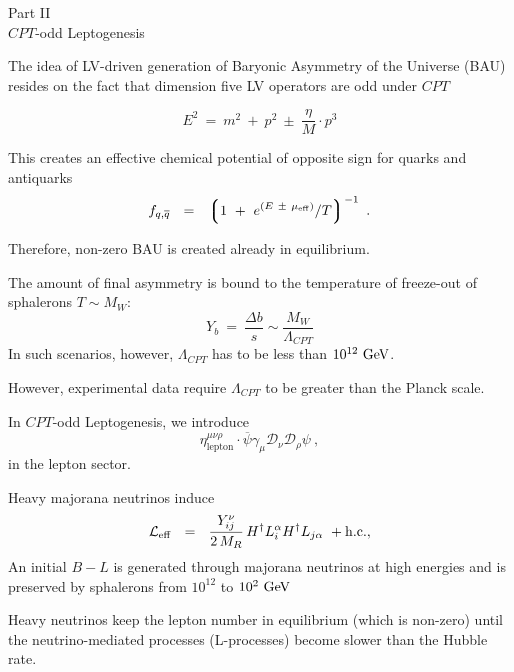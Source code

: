 \documentclass[pdf,UofT06talk,slideColor,colorBG,accumulate]{prosper}
\newcommand{\ov}{\overline}
\newcommand{\md}{\mathcal{D}}
\newcommand{\GeV}{{\rm GeV}}
\begin{document}
\begin{slide}{}

	\vspace{1.5cm}
\fontsize{30.0pt}{30.0pt}\selectfont
\begin{center}
	Part II\\
	$ CPT $-odd Leptogenesis
\end{center}

\end{slide}

\begin{slide}{}

	The idea of LV-driven generation of Baryonic Asymmetry of
	the Universe (BAU) resides on the fact that dimension five
	LV operators are odd under $ CPT $

\[
	E^2 ~=~ m^2 ~+~ p^2 ~\pm~ \frac{\eta}{M} \cdot p^3 
\]

	This creates an effective chemical potential of opposite sign
	for quarks and antiquarks
\[
	f_{q,\ov{q}} ~~=~~
	\left\lgroup  1 ~+~  e^{ (E ~\pm~ \mu_{\rm eff}) }/T 
	\right\rgroup^{-1}~.
\]

\end{slide}

\begin{slide}{}

	Therefore, non-zero BAU is created already in 
	{\myit equilibrium}.

	The amount of final asymmetry is bound to the temperature
	of freeze-out of sphalerons $ T \sim M_W $:
\[
	Y_b  ~=~ \frac{\Delta b}{s}  \sim  \frac{M_W} {\Lambda_{CPT}}
\]
	In such scenarios, however, $ \Lambda_{CPT} $ has to be less
	than $ 10^{12}~\GeV $.

	However, experimental data require $ \Lambda_{CPT} $ to be 
	greater than the {\mybf Planck scale}.

\end{slide}

\begin{slide}{}

	In  $ CPT $-odd Leptogenesis, we introduce 
\[
	\eta_\text{lepton}^{\mu\nu\rho} \cdot
	\ov{\psi} \gamma_\mu \md_\nu \md_\rho \psi~,
\]
	in the lepton sector.

	{\myit Heavy majorana neutrinos} induce
\[
	\mathcal{L}_{\rm eff} ~~=~~ \frac{Y_{ij}^\nu}{2\, M_R} \, H^\dag L_i^\alpha H^\dag L_{j\alpha}~
+{\rm h.c.},
\]
	An initial $ B - L $ is generated
	through majorana neutrinos at high energies and is preserved
	by sphalerons from $ 10^{12} $ to $ 10^{2}~\GeV $

	Heavy neutrinos keep the lepton number in equilibrium
	(which is non-zero) {\myit until} 
	the neutrino-mediated processes ({\myit L-processes})
	become slower than the Hubble rate.

\end{slide}
\end{document}
